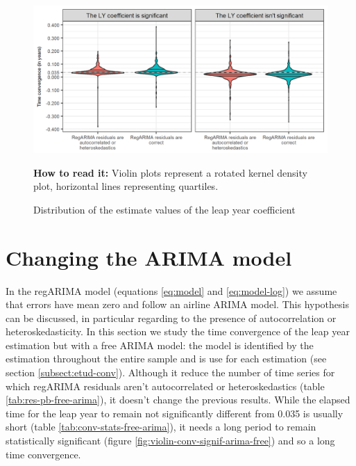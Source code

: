 \documentclass[]{article}
\theoremstyle{definition}
\theoremstyle{definition}
\theoremstyle{definition}
\theoremstyle{remark}
\begin{document}
\begin{figure}[!hbt]
\centering
\caption{Distribution of the estimate values of the leap year coefficient}
\label{fig:violin-conv-coef}
\includegraphics{img/violin_conv_coef.png}
\footnotesize

\textbf{How to read it:} Violin plots represent a rotated kernel density plot, horizontal lines representing quartiles.
\end{figure}

\section{Changing the ARIMA model}\label{changing-the-arima-model}

In the regARIMA model (equations \eqref{eq:model} and \eqref{eq:model-log})
we assume that errors have mean zero and follow an airline ARIMA model.
This hypothesis can be discussed, in particular regarding to the
presence of autocorrelation or heteroskedasticity. In this section we
study the time convergence of the leap year estimation but with a free
ARIMA model: the model is identified by the estimation throughout the
entire sample and is use for each estimation (see section
\ref{subsect:etud-conv}). Although it reduce the number of time series
for which regARIMA residuals aren't autocorrelated or heteroskedastics
(table \ref{tab:res-pb-free-arima}), it doesn't change the previous
results. While the elapsed time for the leap year to remain not
significantly different from 0.035 is usually short (table
\ref{tab:conv-stats-free-arima}), it needs a long period to remain
statistically significant (figure
\ref{fig:violin-conv-signif-arima-free}) and so a long time convergence.
\end{document}

